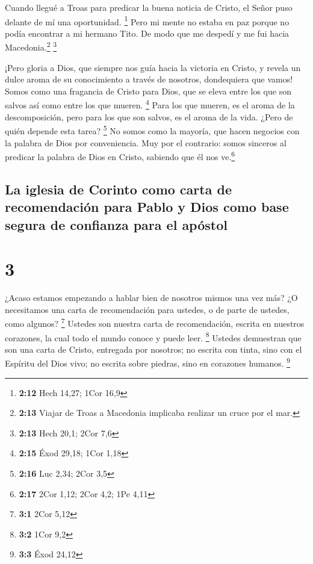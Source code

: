  Cuando llegué a Troas para predicar la buena noticia de
Cristo, el Señor puso delante de mí una oportunidad. \footnote{\textbf{2:12}
  Hech 14,27; 1Cor 16,9}  Pero mi mente no estaba en paz
porque no podía encontrar a mi hermano Tito. De modo que me despedí y me
fui hacia Macedonia.\footnote{\textbf{2:13} Viajar de Troas a Macedonia
  implicaba realizar un cruce por el mar.} \footnote{\textbf{2:13} Hech
  20,1; 2Cor 7,6}

 ¡Pero gloria a Dios, que siempre nos guía hacia la
victoria en Cristo, y revela un dulce aroma de su conocimiento a través
de nosotros, dondequiera que vamos!  Somos como una
fragancia de Cristo para Dios, que se eleva entre los que son salvos así
como entre los que mueren. \footnote{\textbf{2:15} Éxod 29,18; 1Cor 1,18}
 Para los que mueren, es el aroma de la descomposición,
pero para los que son salvos, es el aroma de la vida. ¿Pero de quién
depende esta tarea? \footnote{\textbf{2:16} Luc 2,34; 2Cor 3,5}
 No somos como la mayoría, que hacen negocios con la
palabra de Dios por conveniencia. Muy por el contrario: somos sinceros
al predicar la palabra de Dios en Cristo, sabiendo que él nos
ve.\footnote{\textbf{2:17} 2Cor 1,12; 2Cor 4,2; 1Pe 4,11}

\hypertarget{la-iglesia-de-corinto-como-carta-de-recomendaciuxf3n-para-pablo-y-dios-como-base-segura-de-confianza-para-el-apuxf3stol}{%
\subsection{La iglesia de Corinto como carta de recomendación para Pablo
y Dios como base segura de confianza para el
apóstol}\label{la-iglesia-de-corinto-como-carta-de-recomendaciuxf3n-para-pablo-y-dios-como-base-segura-de-confianza-para-el-apuxf3stol}}

\hypertarget{section-2}{%
\section{3}\label{section-2}}

 ¿Acaso estamos empezando a hablar bien de nosotros mismos
una vez más? ¿O necesitamos una carta de recomendación para ustedes, o
de parte de ustedes, como algunos? \footnote{\textbf{3:1} 2Cor 5,12}
 Ustedes son nuestra carta de recomendación, escrita en
nuestros corazones, la cual todo el mundo conoce y puede leer.
\footnote{\textbf{3:2} 1Cor 9,2}  Ustedes demuestran que
son una carta de Cristo, entregada por nosotros; no escrita con tinta,
sino con el Espíritu del Dios vivo; no escrita sobre piedras, sino en
corazones humanos. \footnote{\textbf{3:3} Éxod 24,12}

